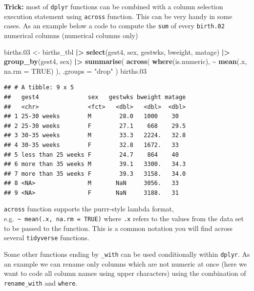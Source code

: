 \documentclass[
]{book}
\newenvironment{Shaded}{\begin{snugshade}}{\end{snugshade}}
\newcommand{\AttributeTok}[1]{\textcolor[rgb]{0.13,0.29,0.53}{#1}}
\newcommand{\ConstantTok}[1]{\textcolor[rgb]{0.56,0.35,0.01}{#1}}
\newcommand{\FloatTok}[1]{\textcolor[rgb]{0.00,0.00,0.81}{#1}}
\newcommand{\FunctionTok}[1]{\textcolor[rgb]{0.13,0.29,0.53}{\textbf{#1}}}
\newcommand{\NormalTok}[1]{#1}
\newcommand{\OtherTok}[1]{\textcolor[rgb]{0.56,0.35,0.01}{#1}}
\newcommand{\SpecialCharTok}[1]{\textcolor[rgb]{0.81,0.36,0.00}{\textbf{#1}}}
\newcommand{\StringTok}[1]{\textcolor[rgb]{0.31,0.60,0.02}{#1}}
\begin{document}
\textbf{Trick:} most of \texttt{dplyr} functions can be combined with a column selection execution statement using
\texttt{across} function. This can be very handy in some cases.
As an example below a code to compute the \texttt{sum} of every \texttt{birth.02} numerical columns (numerical columns only)

\begin{Shaded}
\begin{Highlighting}[]
\NormalTok{births}\FloatTok{.03} \OtherTok{\textless{}{-}}
\NormalTok{  births\_tbl }\SpecialCharTok{|\textgreater{}}
  \FunctionTok{select}\NormalTok{(gest4, sex, gestwks, bweight, matage) }\SpecialCharTok{|\textgreater{}}
  \FunctionTok{group\_by}\NormalTok{(gest4, sex) }\SpecialCharTok{|\textgreater{}}
  \FunctionTok{summarise}\NormalTok{(}
    \FunctionTok{across}\NormalTok{(}
      \FunctionTok{where}\NormalTok{(is.numeric),}
      \SpecialCharTok{\textasciitilde{}} \FunctionTok{mean}\NormalTok{(.x, }\AttributeTok{na.rm =} \ConstantTok{TRUE}\NormalTok{)}
\NormalTok{    ),}
    \AttributeTok{.groups =} \StringTok{"drop"}
\NormalTok{  )}
\NormalTok{births}\FloatTok{.03}
\end{Highlighting}
\end{Shaded}

\begin{verbatim}
## # A tibble: 9 x 5
##   gest4              sex   gestwks bweight matage
##   <chr>              <fct>   <dbl>   <dbl>  <dbl>
## 1 25-30 weeks        M        28.0   1000    30  
## 2 25-30 weeks        F        27.1    668    29.5
## 3 30-35 weeks        M        33.3   2224.   32.8
## 4 30-35 weeks        F        32.8   1672.   33  
## 5 less than 25 weeks F        24.7    864    40  
## 6 more than 35 weeks M        39.1   3300.   34.3
## 7 more than 35 weeks F        39.3   3158.   34.0
## 8 <NA>               M       NaN     3056.   33  
## 9 <NA>               F       NaN     3188.   31
\end{verbatim}

\texttt{across} function supports the purrr-style lambda format, e.g.~\texttt{\textasciitilde{}\ mean(.x,\ na.rm\ =\ TRUE)}
where \texttt{.x} refers to the values from the data set to be passed to the function. This is a common notation you will find across several \texttt{tidyverse} functions.

Some other functions ending by \texttt{\_with} can be used conditionally within \texttt{dplyr}.
As an example we can rename only columns which are not numeric at once (here we want to code all column names using upper characters) using
the combination of \texttt{rename\_with} and \texttt{where}.
\end{document}
